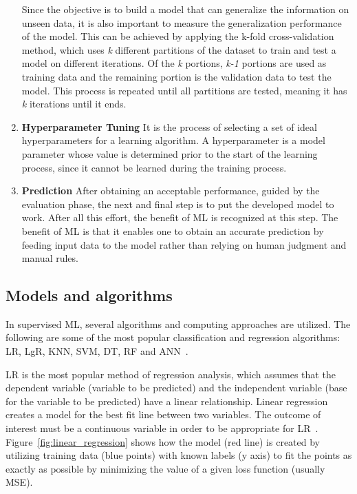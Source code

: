 \begin{enumerate}
    Since the objective is to build a model that can generalize the information on unseen data, it is also important to measure the generalization performance of the model. This can be achieved by applying the k-fold cross-validation method, which uses \textit{k} different partitions of the dataset to train and test a model on different iterations. Of the \textit{k} portions, \textit{k-1} portions are used as training data and the remaining portion is the validation data to test the model. This process is repeated until all partitions are tested, meaning it has \textit{k} iterations until it ends.
    
    \item \textbf{Hyperparameter Tuning} It is the process of selecting a set of ideal hyperparameters for a learning algorithm. A hyperparameter is a model parameter whose value is determined prior to the start of the learning process, since it cannot be learned during the training process.
    
    \item \textbf{Prediction} After obtaining an acceptable performance, guided by the evaluation phase, the next and final step is to put the developed model to work. After all this effort, the benefit of \gls{ML} is recognized at this step. The benefit of \gls{ML} is that it enables one to obtain an accurate prediction by feeding input data to the model rather than relying on human judgment and manual rules.

\end{enumerate}

\subsection{Models and algorithms}\label{sec:models_and_algo}

In supervised \gls{ML}, several algorithms and computing approaches are utilized. The following are some of the most popular classification and regression algorithms: \gls{LR}, \gls{LgR}, \gls{KNN}, \gls{SVM}, \gls{DT}, \gls{RF} and \gls{ANN}~\cite{2020WhatIBM,Chugh2018TypesKnow}.

\gls{LR} is the most popular method of regression analysis, which assumes that the dependent variable (variable to be predicted) and the independent variable (base for the variable to be predicted) have a linear relationship. Linear regression creates a model for the best fit line between two variables. The outcome of interest must be a continuous variable in order to be appropriate for \gls{LR}~\cite{Worster2007UnderstandingAnalyses}. Figure~\ref{fig:linear_regression} shows how the model (red line) is created by utilizing training data (blue points) with known labels (y axis) to fit the points as exactly as possible by minimizing the value of a given loss function (usually \gls{MSE}).

